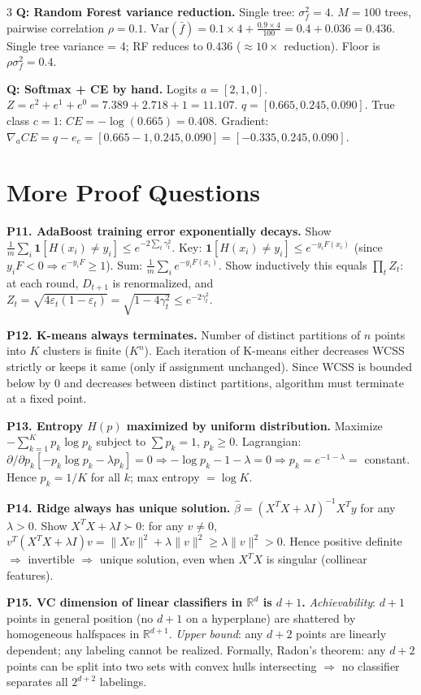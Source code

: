 \documentclass[8pt,fleqn]{extarticle}
\begin{document}
\begin{multicols}{3}
\textbf{Q: Random Forest variance reduction.}
Single tree: $\sigma_f^2=4$. $M=100$ trees, pairwise correlation $\rho=0.1$. $\text{Var}(\bar f)=0.1\times4+\frac{0.9\times4}{100}=0.4+0.036=0.436$. Single tree variance = 4; RF reduces to 0.436 ($\approx10\times$ reduction). Floor is $\rho\sigma_f^2=0.4$.

\textbf{Q: Softmax + CE by hand.}
Logits $a=[2,1,0]$. $Z=e^2+e^1+e^0=7.389+2.718+1=11.107$. $q=[0.665,0.245,0.090]$. True class $c=1$: $CE=-\log(0.665)=0.408$. Gradient: $\nabla_{a}CE=q-e_c=[0.665-1,0.245,0.090]=[-0.335,0.245,0.090]$.


\section*{More Proof Questions}

\textbf{P11. AdaBoost training error exponentially decays.}
Show $\frac1m\sum_i\mathbf1[H(x_i)\ne y_i]\le e^{-2\sum_t\gamma_t^2}$.
Key: $\mathbf1[H(x_i)\ne y_i]\le e^{-y_iF(x_i)}$ (since $y_iF<0\Rightarrow e^{-y_iF}\ge1$). Sum: $\frac1m\sum_i e^{-y_iF(x_i)}$. Show inductively this equals $\prod_tZ_t$: at each round, $D_{t+1}$ is renormalized, and $Z_t=\sqrt{4\varepsilon_t(1-\varepsilon_t)}=\sqrt{1-4\gamma_t^2}\le e^{-2\gamma_t^2}$.

\textbf{P12. K-means always terminates.}
Number of distinct partitions of $n$ points into $K$ clusters is finite ($K^n$). Each iteration of K-means either decreases WCSS strictly or keeps it same (only if assignment unchanged). Since WCSS is bounded below by 0 and decreases between distinct partitions, algorithm must terminate at a fixed point.

\textbf{P13. Entropy $H(p)$ maximized by uniform distribution.}
Maximize $-\sum_{k=1}^K p_k\log p_k$ subject to $\sum p_k=1$, $p_k\ge0$. Lagrangian: $\partial/\partial p_k[{-p_k\log p_k-\lambda p_k}]=0\Rightarrow-\log p_k-1-\lambda=0\Rightarrow p_k=e^{-1-\lambda}=$ constant. Hence $p_k=1/K$ for all $k$; max entropy $=\log K$.

\textbf{P14. Ridge always has unique solution.}
$\hat\beta=(X^TX+\lambda I)^{-1}X^Ty$ for any $\lambda>0$. Show $X^TX+\lambda I\succ0$: for any $v\ne0$, $v^T(X^TX+\lambda I)v=\|Xv\|^2+\lambda\|v\|^2\ge\lambda\|v\|^2>0$. Hence positive definite $\Rightarrow$ invertible $\Rightarrow$ unique solution, even when $X^TX$ is singular (collinear features).

\textbf{P15. VC dimension of linear classifiers in $\mathbb R^d$ is $d+1$.}
\textit{Achievability}: $d+1$ points in general position (no $d+1$ on a hyperplane) are shattered by homogeneous halfspaces in $\mathbb R^{d+1}$. \textit{Upper bound}: any $d+2$ points are linearly dependent; any labeling cannot be realized. Formally, Radon's theorem: any $d+2$ points can be split into two sets with convex hulls intersecting $\Rightarrow$ no classifier separates all $2^{d+2}$ labelings.


\end{multicols}
\end{document}
